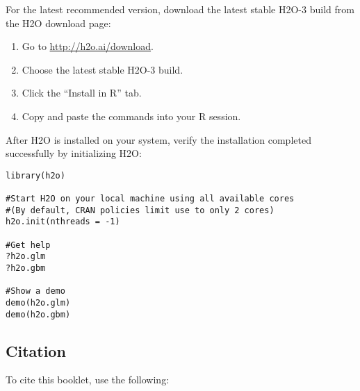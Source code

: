 For the latest recommended version, download the
latest stable H2O-3 build from the H2O download page:

\begin{enumerate}
\item Go to {\url{http://h2o.ai/download}}.
\item Choose the latest stable H2O-3 build.
\item Click the ``Install in R'' tab.
\item Copy and paste the commands into your R session.
\end{enumerate}

\bigskip

After H2O is installed on your system, verify the installation completed successfully by initializing H2O:

\begin{lstlisting}[style=R]
library(h2o)

#Start H2O on your local machine using all available cores
#(By default, CRAN policies limit use to only 2 cores)
h2o.init(nthreads = -1)

#Get help
?h2o.glm
?h2o.gbm

#Show a demo
demo(h2o.glm)
demo(h2o.gbm)
\end{lstlisting}

\subsection{Citation}

To cite this booklet, use the following: 


